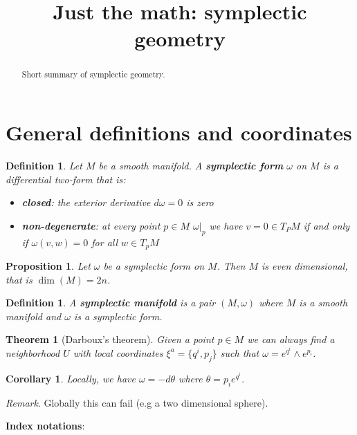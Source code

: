 \documentclass{article}
\title{Just the math: symplectic geometry}
\date{\vspace{-5ex}}
\newtheorem{defn}[equation]{Definition}
\newtheorem{prop}[equation]{Proposition}
\newtheorem{coro}[equation]{Corollary}
\newtheorem{thrm}[equation]{Theorem}
\newenvironment{remark}{\noindent \emph{Remark}.}{\medskip}
\begin{document}
\maketitle


\begin{abstract}
Short summary of symplectic geometry.
\end{abstract}

\section{General definitions and coordinates}

\begin{defn}
	Let $M$ be a smooth manifold. A \textbf{symplectic form} $\omega$ on $M$ is a differential two-form that is:
	\begin{itemize}
		\item \textbf{closed}: the exterior derivative $d \omega = 0$ is zero
		\item \textbf{non-degenerate}: at every point $p \in M$ $\omega|_p$ we have $v=0 \in T_PM$ if and only if $\omega(v, w)=0$ for all $w \in T_pM$
	\end{itemize}
\end{defn}

\begin{prop}
	Let $\omega$ be a symplectic form on $M$. Then $M$ is even dimensional, that is $\dim(M)=2n$.
\end{prop}

\begin{defn}
	A \textbf{symplectic manifold} is a pair $(M, \omega)$ where $M$ is a smooth manifold and $\omega$ is a symplectic form.
\end{defn}

\begin{thrm}[Darboux's theorem]
	Given a point $p \in M$ we can always find a neighborhood $U$ with local coordinates $\xi^a = \{q^i, p_j\}$ such that $\omega = e^{q^i} \wedge e^{p_i}$.
\end{thrm}

\begin{coro}
	Locally, we have $\omega = - d\theta$ where $\theta = p_i e^{q^i}$.
\end{coro}

\begin{remark}
	Globally this can fail (e.g a two dimensional sphere).
\end{remark}

\textbf{Index notations}:
\end{document}
